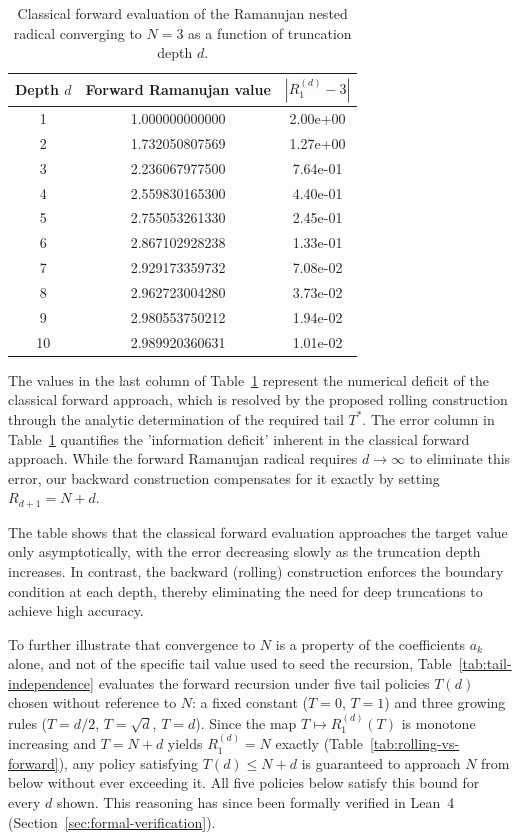 \documentclass[11pt,a4paper]{amsart}
\theoremstyle{plain}
\theoremstyle{definition}
\theoremstyle{remark}
\begin{document}
\begin{table}[H]
\centering
\begin{tabular}{c|c|c}
Depth $d$ & Forward Ramanujan value & $|R_1^{(d)} - 3|$ \\
\hline
1  & 1.000000000000 & 2.00e+00 \\
2  & 1.732050807569 & 1.27e+00 \\
3  & 2.236067977500 & 7.64e-01 \\
4  & 2.559830165300 & 4.40e-01 \\
5  & 2.755053261330 & 2.45e-01 \\
6  & 2.867102928238 & 1.33e-01 \\
7  & 2.929173359732 & 7.08e-02 \\
8  & 2.962723004280 & 3.73e-02 \\
9  & 2.980553750212 & 1.94e-02 \\
10 & 2.989920360631 & 1.01e-02
\end{tabular}
\caption{Classical forward evaluation of the Ramanujan nested radical converging to $N=3$ as a function of truncation depth $d$.}
\label{tab:ramanujan-forward}
\end{table}

The values in the last column of Table~\ref{tab:ramanujan-forward} represent the numerical deficit of the classical forward approach, which is resolved by the proposed rolling construction through the analytic determination of the required tail $T^\ast$.
The error column in Table~\ref{tab:ramanujan-forward} quantifies the 'information deficit' inherent in the classical forward approach. While the forward Ramanujan radical requires $d \to \infty$ to eliminate this error, our backward construction compensates for it exactly by setting $R_{d+1} = N+d$.

The table shows that the classical forward evaluation approaches the target value only asymptotically, with the error decreasing slowly as the truncation depth increases. In contrast, the backward (rolling) construction enforces the boundary condition at each depth, thereby eliminating the need for deep truncations to achieve high accuracy.

To further illustrate that convergence to $N$ is a property of the coefficients $a_k$ alone, and not of the specific tail value used to seed the recursion, Table~\ref{tab:tail-independence} evaluates the forward recursion under five tail policies $T(d)$ chosen without reference to $N$: a fixed constant ($T=0$, $T=1$) and three growing rules ($T=d/2$, $T=\sqrt{d}$, $T=d$). Since the map $T \mapsto R_1^{(d)}(T)$ is monotone increasing and $T = N+d$ yields $R_1^{(d)} = N$ exactly (Table~\ref{tab:rolling-vs-forward}), any policy satisfying $T(d) \le N+d$ is guaranteed to approach $N$ from below without ever exceeding it. All five policies below satisfy this bound for every $d$ shown. This reasoning has since been formally verified in Lean~4 (Section~\ref{sec:formal-verification}).
\end{document}

